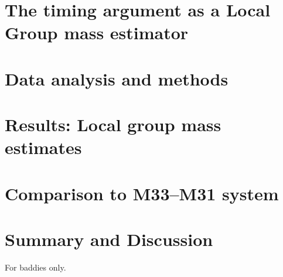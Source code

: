 \documentclass[modern]{aastex631}
\begin{document}
\section{The timing argument as a Local Group mass estimator}
\label{sec:timing}


\section{Data analysis and methods}
\label{sec:methods}


\section{Results: Local group mass estimates}
\label{sec:results}


\section{Comparison to M33--M31 system}
\label{sec:results}


\section{Summary and Discussion}
\label{sec:discussion}



\appendix
For baddies only.

{}

\end{document}
